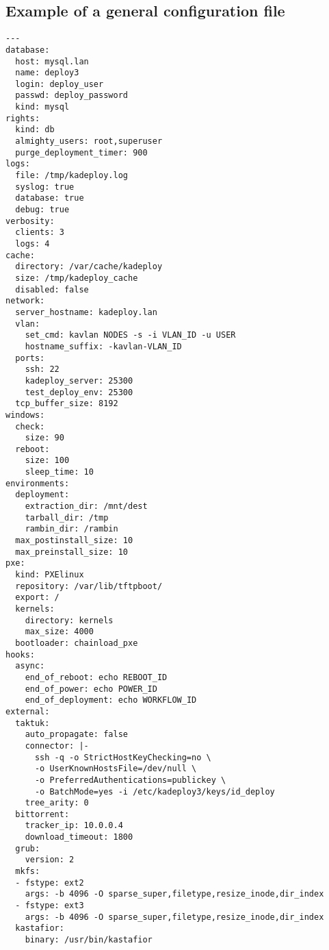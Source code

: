 \documentclass[a4wide,10pt,oneside]{book}
\begin{document}
\subsection{Example of a general configuration file}
\begin{small}
\begin{verbatim}
--- 
database:
  host: mysql.lan
  name: deploy3
  login: deploy_user
  passwd: deploy_password
  kind: mysql
rights:
  kind: db
  almighty_users: root,superuser
  purge_deployment_timer: 900
logs:
  file: /tmp/kadeploy.log
  syslog: true
  database: true
  debug: true
verbosity:
  clients: 3
  logs: 4
cache:
  directory: /var/cache/kadeploy
  size: /tmp/kadeploy_cache
  disabled: false
network:
  server_hostname: kadeploy.lan
  vlan:
    set_cmd: kavlan NODES -s -i VLAN_ID -u USER
    hostname_suffix: -kavlan-VLAN_ID
  ports: 
    ssh: 22
    kadeploy_server: 25300
    test_deploy_env: 25300
  tcp_buffer_size: 8192
windows: 
  check: 
    size: 90
  reboot: 
    size: 100
    sleep_time: 10
environments: 
  deployment: 
    extraction_dir: /mnt/dest
    tarball_dir: /tmp
    rambin_dir: /rambin
  max_postinstall_size: 10
  max_preinstall_size: 10
pxe:
  kind: PXElinux
  repository: /var/lib/tftpboot/
  export: /
  kernels:
    directory: kernels
    max_size: 4000
  bootloader: chainload_pxe
hooks: 
  async: 
    end_of_reboot: echo REBOOT_ID
    end_of_power: echo POWER_ID
    end_of_deployment: echo WORKFLOW_ID
external:
  taktuk: 
    auto_propagate: false
    connector: |-
      ssh -q -o StrictHostKeyChecking=no \
      -o UserKnownHostsFile=/dev/null \
      -o PreferredAuthentications=publickey \
      -o BatchMode=yes -i /etc/kadeploy3/keys/id_deploy
    tree_arity: 0
  bittorrent: 
    tracker_ip: 10.0.0.4
    download_timeout: 1800
  grub:
    version: 2
  mkfs:
  - fstype: ext2
    args: -b 4096 -O sparse_super,filetype,resize_inode,dir_index
  - fstype: ext3
    args: -b 4096 -O sparse_super,filetype,resize_inode,dir_index
  kastafior:
    binary: /usr/bin/kastafior
\end{verbatim}
\end{small}
\end{document}
